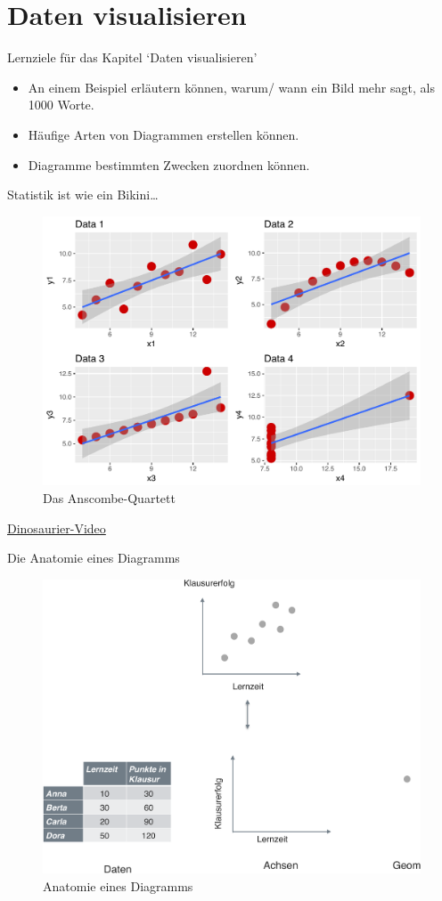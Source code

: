 \section{Daten visualisieren}\label{vis}

\begin{frame}{Lernziele für das Kapitel `Daten visualisieren'}

\begin{itemize}
\tightlist
\item
  An einem Beispiel erläutern können, warum/ wann ein Bild mehr sagt,
  als 1000 Worte.
\item
  Häufige Arten von Diagrammen erstellen können.
\item
  Diagramme bestimmten Zwecken zuordnen können.
\end{itemize}

\end{frame}

\begin{frame}{Statistik ist wie ein Bikini\ldots{}}

\begin{figure}

{\centering \includegraphics[width=0.5\linewidth]{../images/visualisieren/anscombe} 

}

\caption{Das Anscombe-Quartett}\label{fig:fig-anscombe}
\end{figure}

\href{https://youtu.be/DbJyPELmhJc}{Dinosaurier-Video}

\end{frame}

\begin{frame}{Die Anatomie eines Diagramms}

\begin{figure}

{\centering \includegraphics[width=0.5\linewidth]{../images/visualisieren/anatomie_diagramm_crop} 

}

\caption{Anatomie eines Diagramms}\label{fig:fig-anatomie}
\end{figure}

\end{frame}

